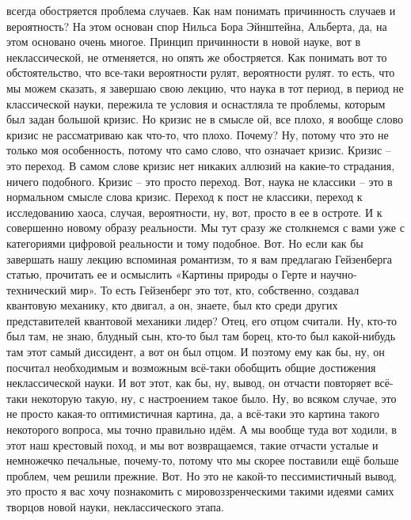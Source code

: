 всегда обостряется проблема случаев. Как нам понимать причинность случаев и
вероятность? На этом основан спор Нильса Бора Эйнштейна, Альберта, да, на этом
основано очень многое. Принцип причинности в новой науке, вот в неклассической,
не отменяется, но опять же обостряется. Как понимать вот то обстоятельство, что
все-таки вероятности рулят, вероятности рулят. то есть, что мы можем сказать, я
завершаю свою лекцию, что наука в тот период, в период не классической науки,
пережила те условия и оснастляла те проблемы, которым был задан большой кризис.
Но кризис не в смысле ой, все плохо, я вообще слово кризис не рассматриваю как
что-то, что плохо. Почему? Ну, потому что это не только моя особенность, потому
что само слово, что означает кризис. Кризис – это переход. В самом слове кризис
нет никаких аллюзий на какие-то страдания, ничего подобного. Кризис – это просто
переход. Вот, наука не классики – это в нормальном смысле слова кризис. Переход
к пост не классики, переход к исследованию хаоса, случая, вероятности, ну, вот,
просто в ее в остроте. И к совершенно новому образу реальности. Мы тут сразу же
столкнемся с вами уже с категориями цифровой реальности и тому подобное. Вот. Но
если как бы завершать нашу лекцию вспоминая романтизм, то я вам предлагаю
Гейзенберга статью, прочитать ее и осмыслить «Картины природы о Герте и научно-
технический мир». То есть Гейзенберг это тот, кто, собственно, создавал
квантовую механику, кто двигал, а он, знаете, был кто среди других
представителей квантовой механики лидер? Отец, его отцом считали. Ну, кто-то был
там, не знаю, блудный сын, кто-то был там борец, кто-то был какой-нибудь там
этот самый диссидент, а вот он был отцом. И поэтому ему как бы, ну, он посчитал
необходимым и возможным всё-таки обобщить общие достижения неклассической науки.
И вот этот, как бы, ну, вывод, он отчасти повторяет всё-таки некоторую такую,
ну, с настроением такое было. Ну, во всяком случае, это не просто какая-то
оптимистичная картина, да, а всё-таки это картина такого некоторого вопроса, мы
точно правильно идём. А мы вообще туда вот ходили, в этот наш крестовый поход, и
мы вот возвращаемся, такие отчасти усталые и немножечко печальные, почему-то,
потому что мы скорее поставили ещё больше проблем, чем решили прежние. Вот. Но
это не какой-то пессимистичный вывод, это просто я вас хочу познакомить с
мировоззренческими такими идеями самих творцов новой науки, неклассического
этапа.
